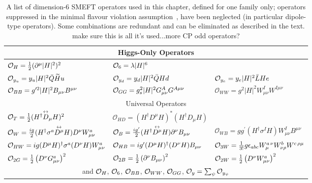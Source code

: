 \renewcommand{\arraystretch}{1.4}
\begin{table}[h]
\begin{center}
 \caption{A list of dimension-6 SMEFT operators used in this chapter, defined for one family only; operators suppressed in the minimal flavour violation assumption~\cite{DAmbrosio:2002vsn}, have been neglected (in particular dipole-type operators). Some combinations are redundant and can be eliminated as described in the text.{\color{red} make sure this is all it's used...more CP odd operators?} }
\label{tab:dim6ops}
{\small
\begin{tabular}{lll}
 \hline\hline
\multicolumn{3}{c}{Higgs-Only Operators}\\
\hline
${\cal O}_H=\frac{1}{2}(\partial^\mu |H|^2)^2$& ${\cal O}_6=\lambda |H|^6$ & \\
%
${\cal O}_{y_u}   =y_u |H|^2    \bar Q  \widetilde{H} u $ & ${\cal O}_{y_d}   =y_d |H|^2    \bar Q  Hd $ & ${\cal O}_{y_e}   =y_e |H|^2    \bar L  H e $  \\
%
${\cal O}_{BB}={g}^{\prime 2} |H|^2 B_{\mu\nu}B^{\mu\nu}$ & ${\cal O}_{GG}=g_s^2 |H|^2 G_{\mu\nu}^A G^{A\mu\nu}$ & $\mathcal{O}_{WW} = g^2 |H|^2 W^{I}_{\mu \nu} W^{I\mu\nu}$ \\
%
\hline\hline
%
\multicolumn{3}{c}{Universal Operators}\\
\hline
 ${\cal O}_T=\frac{1}{2} (H^\dagger {\overset{\text{\scriptsize$\leftrightarrow$}}{D}_\mu} H)^2$  &  $\mathcal{O}_{H D} = (H^\dagger D^\mu H)^*(H^\dagger D_\mu H)$     &  \\
  ${\cal O}_W=\frac{ig}{2}( H^\dagger  \sigma^a \overset{\text{\scriptsize$\leftrightarrow$}}{D^\mu} H  )D^\nu  W_{\mu \nu}^a$ & ${\cal O}_B=\frac{ig'}{2}( H^\dagger  \overset{\text{\scriptsize$\leftrightarrow$}}{D^\mu} H  )\partial^\nu  B_{\mu \nu}$  &  $\mathcal{O}_{W\! B} = gg^\prime(H^\dagger \sigma^IH) W^{I}_{\mu\nu} B^{\mu\nu} $\\
   ${\cal O}_{HW}=i g(D^\mu H)^\dagger\sigma^a(D^\nu H)W^a_{\mu\nu}$  &   ${\cal O}_{HB}=i g'(D^\mu H)^\dagger(D^\nu H)B_{\mu\nu}$ & ${\cal O}_{3W}= \frac{1}{3!} g\epsilon_{abc}W^{a\, \nu}_{\mu}W^{b}_{\nu\rho}W^{c\, \rho\mu}$
   \\
     ${\cal O}_{2G}=\frac 12 \left(D^\nu G^a_{\mu\nu}\right)^2$ & ${\cal O}_{2B}=\frac 12 \left(\partial^\nu B_{\mu\nu}\right)^2$ & ${\cal O}_{2W}=\frac 12 \left(D^\nu W^a_{\mu\nu}\right)^2$\\
  \multicolumn{3}{c}{and ${\cal O}_H$, ${\cal O}_6$, ${\cal O}_{BB}$, ${\cal O}_{WW}$, ${\cal O}_{GG}$,  ${\cal O}_y=\sum_\psi{\cal O}_{y_\psi} $ }\\

\end{tabular}}
\end{center}
\end{table}
